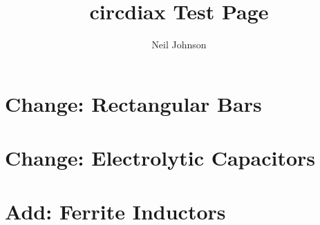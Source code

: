\documentclass[11pt]{article}
\title{circdiax Test Page}
\author{Neil Johnson}
\begin{document}
\maketitle


\section{Change: Rectangular Bars}

\begin{circuitdiagram}[]{37}{25}
\circledtrans
\filleddiode







\end{circuitdiagram}


\section{Change: Electrolytic Capacitors}

\begin{circuitdiagram}[]{33}{10}


\end{circuitdiagram}


\section{Add: Ferrite Inductors}

\begin{circuitdiagram}[]{20}{20}


\end{circuitdiagram}
\end{document}
